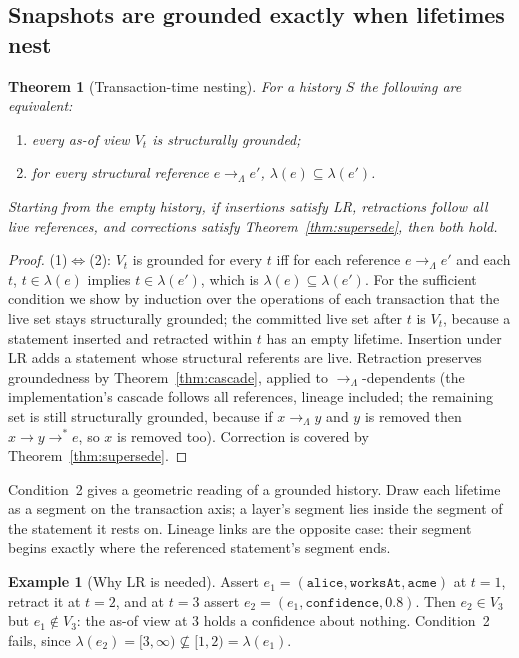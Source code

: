 \documentclass[11pt]{article}
\theoremstyle{plain}
\newtheorem{theorem}{Theorem}
\theoremstyle{definition}
\newtheorem{example}{Example}
\theoremstyle{remark}
\newcommand{\refs}{\rightarrow}          %
\newcommand{\life}{\lambda}              %
\newcommand{\iri}[1]{\texttt{#1}}
\newcommand{\Lin}{\Lambda}               %
\begin{document}
\subsection{Snapshots are grounded exactly when lifetimes nest}

\begin{theorem}[Transaction-time nesting]\label{thm:nesting}
For a history $S$ the following are equivalent:
\begin{enumerate}
\item every as-of view $V_t$ is structurally grounded;
\item for every structural reference $e\refs_{\Lin}e'$, $\life(e)\subseteq\life(e')$.
\end{enumerate}
Starting from the empty history, if insertions satisfy LR, retractions follow
all live references, and corrections satisfy Theorem~\ref{thm:supersede},
then both hold.
\end{theorem}

\begin{proof}
(1)$\Leftrightarrow$(2): $V_t$ is grounded for every $t$ iff for each reference
$e\refs_{\Lin}e'$ and each $t$, $t\in\life(e)$ implies $t\in\life(e')$, which
is $\life(e)\subseteq\life(e')$. For the sufficient condition we show by
induction over the operations of each transaction that the live set stays
structurally grounded; the committed live set after $t$ is $V_t$, because a
statement inserted and retracted within $t$ has an empty lifetime. Insertion
under LR adds a statement whose structural referents are live. Retraction
preserves groundedness by Theorem~\ref{thm:cascade}, applied to
$\refs_{\Lin}$-dependents (the implementation's cascade follows all references,
lineage included; the remaining set is still structurally grounded, because if
$x\refs_{\Lin}y$ and $y$ is removed then $x\refs y\refs^{*}e$, so $x$ is removed
too). Correction is covered by
Theorem~\ref{thm:supersede}.
\end{proof}

Condition~2 gives a geometric reading of a grounded history. Draw each
lifetime as a segment on the transaction axis; a layer's segment lies inside
the segment of the statement it rests on. Lineage links are the opposite case:
their segment begins exactly where the referenced statement's segment ends.

\begin{example}[Why LR is needed]\label{ex:counter}
Assert $e_1=(\iri{alice},\iri{worksAt},\iri{acme})$ at $t=1$, retract it at
$t=2$, and at $t=3$ assert $e_2=(e_1,\iri{confidence},0.8)$. Then
$e_2\in V_3$ but $e_1\notin V_3$: the as-of view at $3$ holds a confidence about
nothing. Condition~2 fails, since $\life(e_2)=[3,\infty)\not\subseteq[1,2)=\life(e_1)$.
\end{example}
\end{document}
